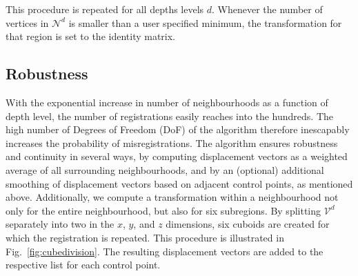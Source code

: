 This procedure is repeated for all depths levels $d$. Whenever the number of vertices in $\mathcal{N}^{d}$ is smaller than a user specified minimum, the transformation for that region is set to the identity matrix. 

\subsection*{Robustness}
\label{sec:robustness}
With the exponential increase in number of neighbourhoods as a function of depth level, the number of registrations easily reaches into the hundreds. The high number of Degrees of Freedom (DoF) of the algorithm therefore inescapably increases the probability of misregistrations. The algorithm ensures robustness and continuity in several ways, by computing displacement vectors as a weighted average of all surrounding neighbourhoods, and by an (optional) additional smoothing of displacement vectors based on adjacent control points, as mentioned above. Additionally, we compute a transformation within a neighbourhood not only for the entire neighbourhood, but also for six subregions. By splitting $\mathcal{V}^{d}$ separately into two in the $x$, $y$, and $z$ dimensions, six cuboids are created for which the registration is repeated. This procedure is  illustrated in Fig.~\ref{fig:cubedivision}. The resulting displacement vectors are added to the respective list for each control point. 


